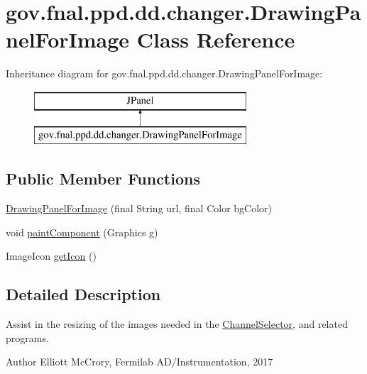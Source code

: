 \hypertarget{classgov_1_1fnal_1_1ppd_1_1dd_1_1changer_1_1DrawingPanelForImage}{\section{gov.\-fnal.\-ppd.\-dd.\-changer.\-Drawing\-Panel\-For\-Image Class Reference}
\label{classgov_1_1fnal_1_1ppd_1_1dd_1_1changer_1_1DrawingPanelForImage}
}
Inheritance diagram for gov.\-fnal.\-ppd.\-dd.\-changer.\-Drawing\-Panel\-For\-Image\-:\begin{figure}[H]
\begin{center}
\leavevmode
\includegraphics[height=2.000000cm]{classgov_1_1fnal_1_1ppd_1_1dd_1_1changer_1_1DrawingPanelForImage}
\end{center}
\end{figure}
\subsection*{Public Member Functions}
\begin{DoxyCompactItemize}
\item 
\hyperlink{classgov_1_1fnal_1_1ppd_1_1dd_1_1changer_1_1DrawingPanelForImage_a744ff322c9e8fe0decb1ac2bc61e18a5}{Drawing\-Panel\-For\-Image} (final String url, final Color bg\-Color)
\item 
void \hyperlink{classgov_1_1fnal_1_1ppd_1_1dd_1_1changer_1_1DrawingPanelForImage_a54d6ead6292aeea4b6ba3db069e3c23d}{paint\-Component} (Graphics g)
\item 
Image\-Icon \hyperlink{classgov_1_1fnal_1_1ppd_1_1dd_1_1changer_1_1DrawingPanelForImage_a938a2167687485031b3a4ab35eedeebe}{get\-Icon} ()
\end{DoxyCompactItemize}


\subsection{Detailed Description}
Assist in the resizing of the images needed in the \hyperlink{classgov_1_1fnal_1_1ppd_1_1dd_1_1ChannelSelector}{Channel\-Selector}, and related programs.

\begin{DoxyAuthor}{Author}
Elliott Mc\-Crory, Fermilab A\-D/\-Instrumentation, 2017 
\end{DoxyAuthor}


